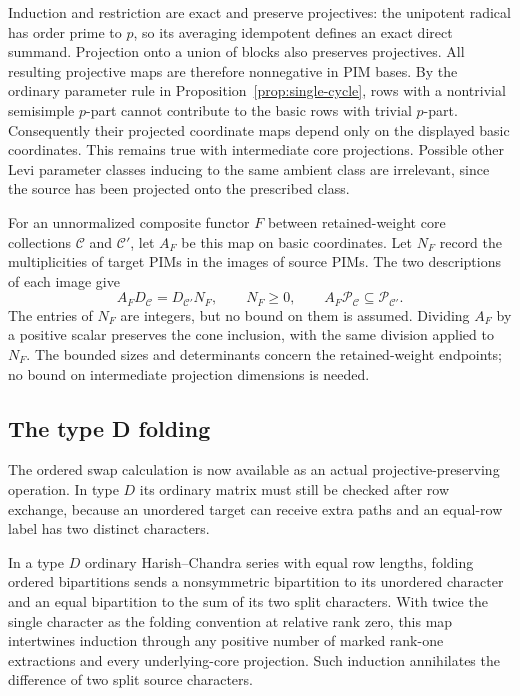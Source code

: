 Induction and restriction are exact and preserve projectives:
the unipotent radical has order prime to \(p\), so its averaging
idempotent defines an exact direct summand.  Projection onto a
union of blocks also preserves projectives.  All resulting
projective maps are therefore nonnegative in PIM bases.
By the ordinary parameter rule in
Proposition~\ref{prop:single-cycle}, rows with a nontrivial
semisimple \(p\)-part cannot contribute to the basic rows with
trivial \(p\)-part.  Consequently their projected coordinate maps
depend only on the displayed basic coordinates.  This remains
true with intermediate core projections.  Possible other Levi
parameter classes inducing to the same ambient class are
irrelevant, since the source has been projected onto the
prescribed class.

For an unnormalized composite functor \(F\) between retained-weight
core collections \(\mathcal C\) and \(\mathcal C'\), let
\(A_F\) be this map on basic coordinates.  Let \(N_F\) record
the multiplicities of target PIMs in the images of source PIMs.
The two descriptions of each image give
\[
 A_FD_{\mathcal C}=D_{\mathcal C'}N_F,
 \qquad N_F\geq0,
 \qquad
 A_F\mathcal P_{\mathcal C}\subseteq\mathcal P_{\mathcal C'}.
\]
The entries of \(N_F\) are integers, but no bound on them is
assumed.  Dividing \(A_F\) by a positive scalar preserves the
cone inclusion, with the same division applied to \(N_F\).
The bounded sizes and determinants concern the retained-weight
endpoints; no bound on intermediate projection dimensions is needed.

\subsection{The type D folding}

The ordered swap calculation is now available as an actual
projective-preserving operation.  In type $D$ its ordinary matrix
must still be checked after row exchange, because an unordered
target can receive extra paths and an equal-row label has two
distinct characters.

\begin{lemma}\label{run:folding}
In a type \(D\) ordinary Harish--Chandra series with equal row
lengths, folding ordered bipartitions sends a nonsymmetric
bipartition to its unordered character and an equal bipartition
to the sum of its two split characters.  With twice the single
character as the folding convention at relative rank zero, this
map intertwines induction through any positive number of marked
rank-one extractions and every underlying-core projection.
Such induction annihilates the difference of two split source
characters.
\end{lemma}

